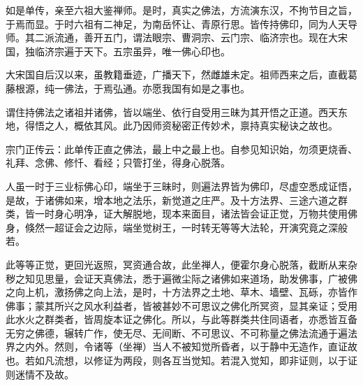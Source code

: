 如是单传，亲至六祖大鉴禅师。是时，真实之佛法，方流演东汉，不拘节目之旨，于焉而显。于时六祖有二神足，为南岳怀让、青原行思。皆传持佛印，同为人天导师。其二派流通，善开五门，谓法眼宗、曹洞宗、云门宗、临济宗也。现在大宋国，独临济宗遍于天下。五宗虽异，唯一佛心印也。

大宋国自后汉以来，虽教籍垂迹，广播天下，然雌雄未定。祖师西来之后，直截葛藤根源，纯一佛法，于焉弘通。亦愿我国有如是之事也。

谓住持佛法之诸祖并诸佛，皆以端坐、依行自受用三昧为其开悟之正道。西天东地，得悟之人，概依其风。此乃因师资秘密正传妙术，禀持真实秘诀之故也。

宗门正传云：此单传正直之佛法，最上中之最上也。自参见知识始，勿须更烧香、礼拜、念佛、修忏、看经；只管打坐，得身心脱落。

人虽一时于三业标佛心印，端坐于三昧时，则遍法界皆为佛印，尽虚空悉成证悟，是故，于诸佛如来，增本地之法乐，新觉道之庄严。及十方法界、三途六道之群类，皆一时身心明净，证大解脱地，现本来面目，诸法皆会证正觉，万物共使用佛身，倏然一超证会之边际，端坐觉树王，一时转无等等大法轮，开演究竟之深般若。

此等等正觉，更回光返照，冥资通合故，此坐禅人，便霍尔身心脱落，截断从来杂秽之知见思量，会证天真佛法，悉于遍微尘际之诸佛如来道场，助发佛事，广被佛之向上机，激扬佛之向上法，是时，十方法界之土地、草木、墙壁、瓦砾，亦皆作佛事；蒙其所兴之风水利益者，皆被甚妙不可思议之佛化所冥资，显其亲证；受用此水火之群类者，皆周旋本证之佛化。所以，与此等群类共住同语者，亦悉皆互备无穷之佛德，辗转广作，使无尽、无间断、不可思议、不可称量之佛法流通于遍法界之内外。然则，令诸等（坐禅）当人不被知觉所昏者，以于静中无造作，直证故也。若如凡流想，以修证为两段，则各互当觉知。若混入觉知，即非证则，以于证则迷情不及故。
